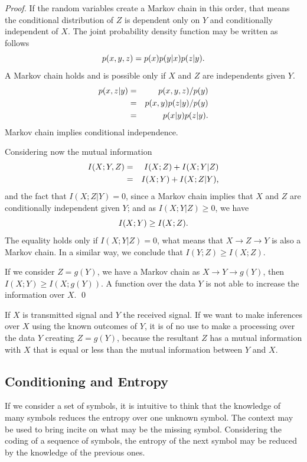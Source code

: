 \begin{proof}
If the random variables create a Markov chain in this order, that means the conditional 
distribution of $Z$ is dependent only on $Y$ and conditionally independent of $X$. 
The joint probability density function may be written as follows
\begin{equation}
p(x,y,z) = p(x)p(y|x)p(z|y) \textmd{.}
\end{equation}
A Markov chain holds and is possible only if $X$ and $Z$ are independents given $Y$.
\begin{eqnarray}
p(x,z|y) &=& p(x,y,z) / p(y) \nonumber \\
&=& p(x,y)p(z|y) / p(y) \nonumber \\
&=& p(x|y)p(z|y) \textmd{.}
\end{eqnarray}
Markov chain implies conditional independence.

Considering now the mutual information
\begin{eqnarray}
I(X;Y,Z) &=& I(X;Z) + I(X;Y|Z) \nonumber \\
&=& I(X;Y) + I(X;Z|Y) \textmd{,}
\end{eqnarray}
and the fact that $I(X;Z|Y) = 0$, since a Markov chain implies that $X$ and $Z$ are conditionally 
independent given $Y$; and as $I(X;Y|Z) \geq 0$, we have
\begin{equation}
I(X;Y) \geq I(X;Z) \textmd{.}
\end{equation}
The equality holds only if $I(X;Y|Z) = 0$, what means that $X \rightarrow Z \rightarrow Y$ is also a Markov chain.
In a similar way, we conclude that $I(Y;Z) \geq I(X;Z)$.

If we consider $Z = g(Y)$, we have a Markov chain as $X \rightarrow Y \rightarrow g(Y)$, then $I(X;Y) \geq I(X;g(Y))$. 
A function over the data $Y$ is not able to increase the information over $X$. \qed
\end{proof}
\begin{remark}
If $X$ is transmitted signal and $Y$ the received signal. If we want to make inferences over $X$ 
using the known outcomes of $Y$, it is of no use to make a processing over the data $Y$ creating $Z=g(Y)$, 
because the resultant $Z$ has a mutual information with $X$ that is equal or less than the mutual information 
between $Y$ and $X$.
\end{remark}



\subsection{Conditioning and Entropy}
If we consider a set of symbols, it is intuitive to think that the knowledge of many symbols reduces the entropy 
over one unknown symbol. The context may be used to bring incite on what may be the missing symbol. 
Considering the coding of a sequence of symbols, the entropy of the next symbol may be reduced by the knowledge of the previous ones.

